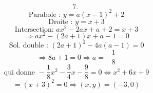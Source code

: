 \documentclass{article}
\begin{document}
\[\text{7. }\]
\[\text{Parabole : } y = a(x-1)^2 + 2\]
\[\text{Droite : } y = x + 3\]
\[\text{Intersection: } ax^2 - 2ax + a + 2 = x + 3\]
\[ \Rightarrow ax^2 - (2a+1)x + a - 1 = 0 \]
\[\text{Sol. double : } (2a+1)^2 - 4a(a-1) = 0\]
\[ \Rightarrow 8a + 1 = 0 \Rightarrow a = -\frac{1}{8} \]
\[\text{qui donne } -\frac{1}{8}x^2 - \frac{3}{4}x - \frac{9}{8} = 0 \Leftrightarrow x^2 + 6x + 9\]
\[ = (x+3)^2 = 0 \Rightarrow (x,y) = (-3,0) \]
\end{document}
